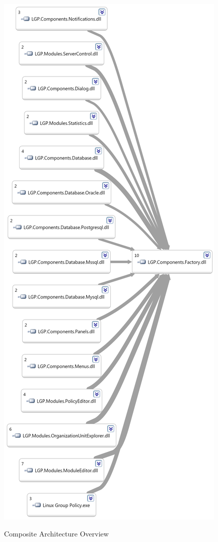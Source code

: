 \begin{multicols}{2}
			\begin{figurehere}
				\centering
				\includegraphics[scale=0.25]{pages/chapter3/figures/archover.png}
				\vspace{-2mm}
				\caption{Composite Architecture Overview}
				\label{fig:archover}
			\end{figurehere}	
		
		\end{multicols}
		
